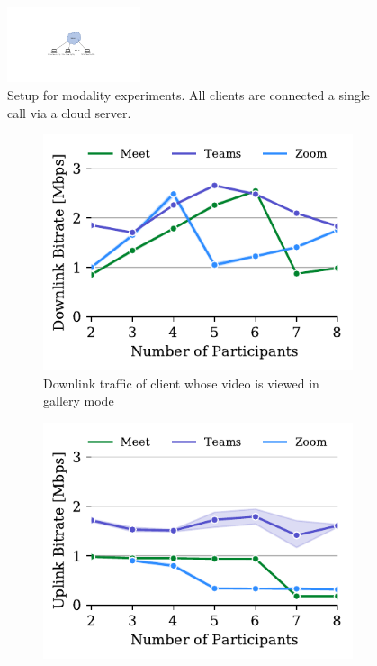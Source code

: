 \begin{figure}[h]
\centering
    \includegraphics[width=0.35\textwidth,keepaspectratio]{../figures/methodology/modality-setup.pdf}
    \caption{Setup for modality experiments. All clients are connected a single call via a cloud server.}
    \label{fig:modality-setup}
\end{figure}

\begin{figure}[ht]
\begin{subfigure}[t]{.33\textwidth}
  \centering
   \captionsetup{width=.9\linewidth}
    \includegraphics[width=1\textwidth,keepaspectratio]{../figures/modality/speaker_recv.pdf}
    \caption{Downlink traffic of client whose video is viewed in gallery mode}
    \label{fig:gallery-recv}
\end{subfigure}
\hfill
\begin{subfigure}[t]{.33\textwidth}
  \centering
   \captionsetup{width=.9\linewidth}
    \includegraphics[width=1\textwidth,keepaspectratio]{../figures/modality/gallery_send.pdf}

\end{subfigure}
\end{figure}
